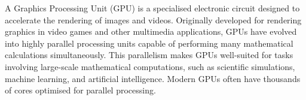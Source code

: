 A Graphics Processing Unit (GPU) is a specialised electronic circuit designed to accelerate the rendering of images and videos. Originally developed for rendering graphics in video games and other multimedia applications, GPUs have evolved into highly parallel processing units capable of performing many mathematical calculations simultaneously. This parallelism makes GPUs well-suited for tasks involving large-scale mathematical computations, such as scientific simulations, machine learning, and artificial intelligence. Modern GPUs often have thousands of cores optimised for parallel processing.\\